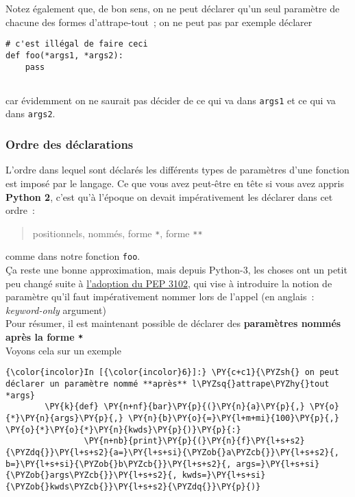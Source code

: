     Notez également que, de bon sens, on ne peut déclarer qu'un seul
paramètre de chacune des formes d'attrape-tout~; on ne peut pas par
exemple déclarer

\begin{verbatim}
# c'est illégal de faire ceci
def foo(*args1, *args2):
    pass
  
\end{verbatim}

car évidemment on ne saurait pas décider de ce qui va dans
\texttt{args1} et ce qui va dans \texttt{args2}.

    \hypertarget{ordre-des-duxe9clarations}{%
\subsubsection{Ordre des déclarations}\label{ordre-des-duxe9clarations}}

    L'ordre dans lequel sont déclarés les différents types de paramètres
d'une fonction est imposé par le langage. Ce que vous avez peut-être en
tête si vous avez appris \textbf{Python 2}, c'est qu'à l'époque on
devait impérativement les déclarer dans cet ordre~:

\begin{quote}
positionnels, nommés, forme \texttt{*}, forme \texttt{**}
\end{quote}

comme dans notre fonction \texttt{foo}.\\

    Ça reste une bonne approximation, mais depuis Python-3, les choses ont
un petit peu changé suite à
\href{https://www.python.org/dev/peps/pep-3102/}{l'adoption du PEP
3102}, qui vise à introduire la notion de paramètre qu'il faut
impérativement nommer lors de l'appel (en anglais~: \emph{keyword-only}
argument)\\

    Pour résumer, il est maintenant possible de déclarer des
\textbf{paramètres nommés après la forme \texttt{*}}\\

Voyons cela sur un exemple

    \begin{Verbatim}[commandchars=\\\{\}]
{\color{incolor}In [{\color{incolor}6}]:} \PY{c+c1}{\PYZsh{} on peut déclarer un paramètre nommé **après** l\PYZsq{}attrape\PYZhy{}tout *args}
        \PY{k}{def} \PY{n+nf}{bar}\PY{p}{(}\PY{n}{a}\PY{p}{,} \PY{o}{*}\PY{n}{args}\PY{p}{,} \PY{n}{b}\PY{o}{=}\PY{l+m+mi}{100}\PY{p}{,} \PY{o}{*}\PY{o}{*}\PY{n}{kwds}\PY{p}{)}\PY{p}{:}
                \PY{n+nb}{print}\PY{p}{(}\PY{n}{f}\PY{l+s+s2}{\PYZdq{}}\PY{l+s+s2}{a=}\PY{l+s+si}{\PYZob{}a\PYZcb{}}\PY{l+s+s2}{, b=}\PY{l+s+si}{\PYZob{}b\PYZcb{}}\PY{l+s+s2}{, args=}\PY{l+s+si}{\PYZob{}args\PYZcb{}}\PY{l+s+s2}{, kwds=}\PY{l+s+si}{\PYZob{}kwds\PYZcb{}}\PY{l+s+s2}{\PYZdq{}}\PY{p}{)}
\end{Verbatim}


